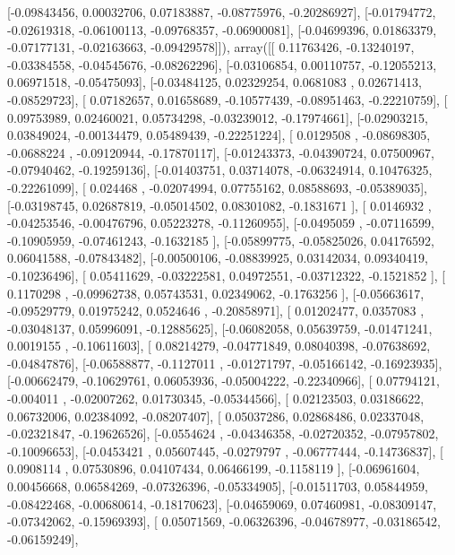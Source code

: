 \documentclass{article}
\begin{document}
       [-0.09843456,  0.00032706,  0.07183887, -0.08775976, -0.20286927],
       [-0.01794772, -0.02619318, -0.06100113, -0.09768357, -0.06900081],
       [-0.04699396,  0.01863379, -0.07177131, -0.02163663, -0.09429578]]), array([[ 0.11763426, -0.13240197, -0.03384558, -0.04545676, -0.08262296],
       [-0.03106854,  0.00110757, -0.12055213,  0.06971518, -0.05475093],
       [-0.03484125,  0.02329254,  0.0681083 ,  0.02671413, -0.08529723],
       [ 0.07182657,  0.01658689, -0.10577439, -0.08951463, -0.22210759],
       [ 0.09753989,  0.02460021,  0.05734298, -0.03239012, -0.17974661],
       [-0.02903215,  0.03849024, -0.00134479,  0.05489439, -0.22251224],
       [ 0.0129508 , -0.08698305, -0.0688224 , -0.09120944, -0.17870117],
       [-0.01243373, -0.04390724,  0.07500967, -0.07940462, -0.19259136],
       [-0.01403751,  0.03714078, -0.06324914,  0.10476325, -0.22261099],
       [ 0.024468  , -0.02074994,  0.07755162,  0.08588693, -0.05389035],
       [-0.03198745,  0.02687819, -0.05014502,  0.08301082, -0.1831671 ],
       [ 0.0146932 , -0.04253546, -0.00476796,  0.05223278, -0.11260955],
       [-0.0495059 , -0.07116599, -0.10905959, -0.07461243, -0.1632185 ],
       [-0.05899775, -0.05825026,  0.04176592,  0.06041588, -0.07843482],
       [-0.00500106, -0.08839925,  0.03142034,  0.09340419, -0.10236496],
       [ 0.05411629, -0.03222581,  0.04972551, -0.03712322, -0.1521852 ],
       [ 0.1170298 , -0.09962738,  0.05743531,  0.02349062, -0.1763256 ],
       [-0.05663617, -0.09529779,  0.01975242,  0.0524646 , -0.20858971],
       [ 0.01202477,  0.0357083 , -0.03048137,  0.05996091, -0.12885625],
       [-0.06082058,  0.05639759, -0.01471241,  0.0019155 , -0.10611603],
       [ 0.08214279, -0.04771849,  0.08040398, -0.07638692, -0.04847876],
       [-0.06588877, -0.1127011 , -0.01271797, -0.05166142, -0.16923935],
       [-0.00662479, -0.10629761,  0.06053936, -0.05004222, -0.22340966],
       [ 0.07794121, -0.004011  , -0.02007262,  0.01730345, -0.05344566],
       [ 0.02123503,  0.03186622,  0.06732006,  0.02384092, -0.08207407],
       [ 0.05037286,  0.02868486,  0.02337048, -0.02321847, -0.19626526],
       [-0.0554624 , -0.04346358, -0.02720352, -0.07957802, -0.10096653],
       [-0.0453421 ,  0.05607445, -0.0279797 , -0.06777444, -0.14736837],
       [ 0.0908114 ,  0.07530896,  0.04107434,  0.06466199, -0.1158119 ],
       [-0.06961604,  0.00456668,  0.06584269, -0.07326396, -0.05334905],
       [-0.01511703,  0.05844959, -0.08422468, -0.00680614, -0.18170623],
       [-0.04659069,  0.07460981, -0.08309147, -0.07342062, -0.15969393],
       [ 0.05071569, -0.06326396, -0.04678977, -0.03186542, -0.06159249],
\end{document}
